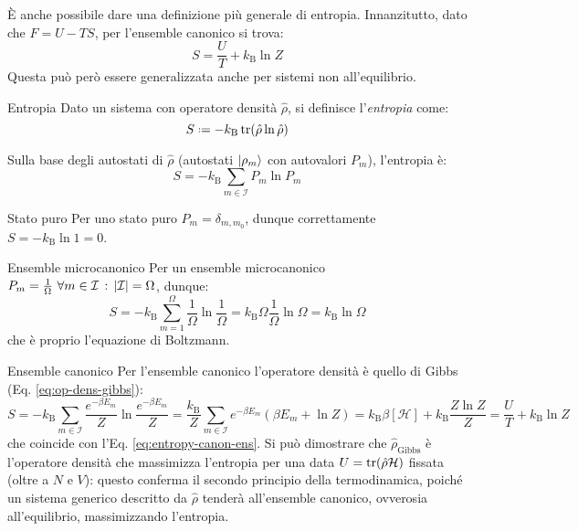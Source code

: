 È anche possibile dare una definizione più generale di entropia. Innanzitutto, dato che $ F = U - TS $, per l'ensemble canonico si trova:
\begin{equation}
	S = \frac{U}{T} + k_\text{B} \ln Z
	\label{eq:entropy-canon-ens}
\end{equation}
Questa può però essere generalizzata anche per sistemi non all'equilibrio.

\begin{definition}{Entropia}{}
	Dato un sistema con operatore densità $ \hat{\rho} $, si definisce l'\textit{entropia} come:
	\begin{equation}
		S \defeq - k_\text{B} \tr(\hat{\rho} \ln \hat{\rho})
	\end{equation}
\end{definition}

Sulla base degli autostati di $ \hat{\rho} $ (autostati $ \ket{\rho_m} $ con autovalori $ P_m $), l'entropia è:
\begin{equation}
	S = - k_\text{B} \sum_{m \in \mathcal{I}} P_m \ln P_m
\end{equation}

\begin{example}{Stato puro}{}
	Per uno stato puro $ P_m = \delta_{m,m_0} $, dunque correttamente $ S = -k_\text{B} \ln 1 = 0 $.
\end{example}

\begin{example}{Ensemble microcanonico}{}
	Per un ensemble microcanonico $ P_m = \frac{1}{\Omega} \,\,\forall m \in \mathcal{I} \,:\, \left\lvert\mathcal{I}\right\rvert = \Omega $, dunque:
	\begin{equation*}
		S = - k_\text{B} \sum_{m = 1}^\Omega \frac{1}{\Omega} \ln \frac{1}{\Omega} = k_\text{B} \Omega \frac{1}{\Omega} \ln \Omega = k_\text{B} \ln \Omega
	\end{equation*}
	che è proprio l'equazione di Boltzmann.
\end{example}

\begin{example}{Ensemble canonico}{}
	Per l'ensemble canonico l'operatore densità è quello di Gibbs (Eq. \ref{eq:op-dens-gibbs}):
	\begin{equation*}
		S = - k_\text{B} \sum_{m \in \mathcal{I}} \frac{e^{-\beta E_m}}{Z} \ln \frac{e^{-\beta E_m}}{Z} = \frac{k_\text{B}}{Z} \sum_{m \in \mathcal{I}} e^{-\beta E_m} (\beta E_m + \ln Z) = k_\text{B} \beta [\mathcal{H}] + k_\text{B} \frac{Z \ln Z}{Z} = \frac{U}{T} + k_\text{B} \ln Z
	\end{equation*}
	che coincide con l'Eq. \ref{eq:entropy-canon-ens}. Si può dimostrare che $ \hat{\rho}_\text{Gibbs} $ è l'operatore densità che massimizza l'entropia per una data $ U = \operatorname{tr}(\hat{\rho}\mathcal{H}) $ fissata (oltre a $ N $ e $ V $): questo conferma il secondo principio della termodinamica, poiché un sistema generico descritto da $ \hat{\rho} $ tenderà all'ensemble canonico, ovverosia all'equilibrio, massimizzando l'entropia.
\end{example}


